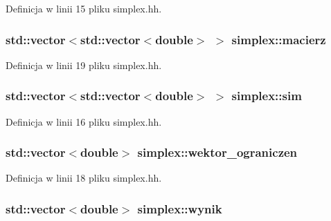 \-Definicja w linii 15 pliku simplex.\-hh.

\hypertarget{classsimplex_a0feea936d0817d90c981eef82f5c2fca}{
\subsubsection[{macierz}]{\setlength{\rightskip}{0pt plus 5cm}std\-::vector$<$std\-::vector$<$double$>$ $>$ {\bf simplex\-::macierz}}}\label{classsimplex_a0feea936d0817d90c981eef82f5c2fca}


\-Definicja w linii 19 pliku simplex.\-hh.

\hypertarget{classsimplex_a6065ecf2bfe56fd9ea1bf8df71facd19}{
\subsubsection[{sim}]{\setlength{\rightskip}{0pt plus 5cm}std\-::vector$<$std\-::vector$<$double$>$ $>$ {\bf simplex\-::sim}}}\label{classsimplex_a6065ecf2bfe56fd9ea1bf8df71facd19}


\-Definicja w linii 16 pliku simplex.\-hh.

\hypertarget{classsimplex_a6f539b78f5e795a53c436d07e016430d}{
\subsubsection[{wektor\-\_\-ograniczen}]{\setlength{\rightskip}{0pt plus 5cm}std\-::vector$<$double$>$ {\bf simplex\-::wektor\-\_\-ograniczen}}}\label{classsimplex_a6f539b78f5e795a53c436d07e016430d}


\-Definicja w linii 18 pliku simplex.\-hh.

\hypertarget{classsimplex_ab00cd763b725900752b6fe0401115fab}{
\subsubsection[{wynik}]{\setlength{\rightskip}{0pt plus 5cm}std\-::vector$<$double$>$ {\bf simplex\-::wynik}}}\label{classsimplex_ab00cd763b725900752b6fe0401115fab}


